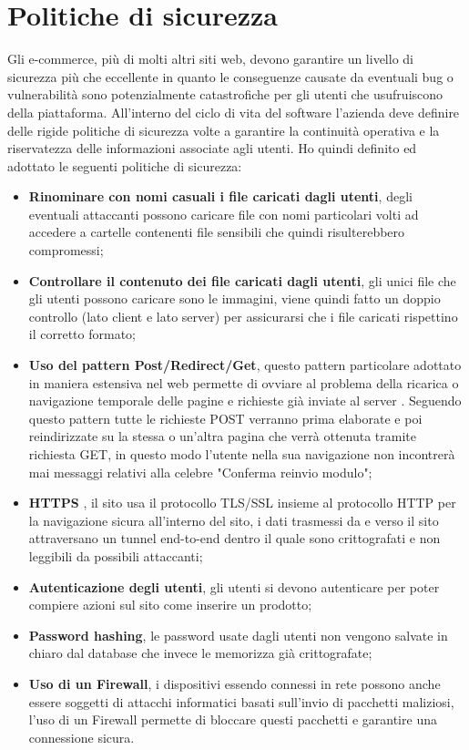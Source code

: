 \section{Politiche di sicurezza}
Gli e-commerce, più di molti altri siti web, devono garantire un livello di sicurezza più che eccellente in quanto le conseguenze causate da eventuali bug o vulnerabilità sono potenzialmente catastrofiche per gli utenti che usufruiscono della piattaforma. All'interno del ciclo di vita del software l'azienda deve definire delle rigide politiche di sicurezza volte a garantire la continuità operativa e la riservatezza delle informazioni associate agli utenti. Ho quindi definito ed adottato le seguenti politiche di sicurezza: 
\begin{itemize}
    \item \textbf{Rinominare con nomi casuali i file caricati dagli utenti}, degli eventuali attaccanti possono caricare file con nomi particolari volti ad accedere a cartelle contenenti file sensibili che quindi risulterebbero compromessi; 
    \item \textbf{Controllare il contenuto dei file caricati dagli utenti}, gli unici file che gli utenti possono caricare sono le immagini, viene quindi fatto un doppio controllo (lato client e lato server) per assicurarsi che i file caricati rispettino il corretto formato; 
    \item \textbf{Uso del pattern Post/Redirect/Get}, questo pattern particolare adottato in maniera estensiva nel web permette di ovviare al problema della ricarica o navigazione temporale delle pagine e richieste già inviate al server \cite{PRG}. Seguendo questo pattern tutte le richieste POST verranno prima elaborate e poi reindirizzate su la stessa o un'altra pagina che verrà ottenuta tramite richiesta GET, in questo modo l'utente nella sua navigazione non incontrerà mai messaggi relativi alla celebre "Conferma reinvio modulo"; 
    \item \textbf{HTTPS} \cite{HTTPS}, il sito usa il protocollo TLS/SSL insieme al protocollo HTTP per la navigazione sicura all'interno del sito, i dati trasmessi da e verso il sito attraversano un tunnel end-to-end dentro il quale sono crittografati e non leggibili da possibili attaccanti; 
    \item \textbf{Autenticazione degli utenti}, gli utenti si devono autenticare per poter compiere azioni sul sito come inserire un prodotto; 
    \item \textbf{Password hashing}, le password usate dagli utenti non vengono salvate in chiaro dal database che invece le memorizza già crittografate;
    \item \textbf{Uso di un Firewall}, i dispositivi essendo connessi in rete possono anche essere soggetti di attacchi informatici basati sull'invio di pacchetti maliziosi, l'uso di un Firewall permette di bloccare questi pacchetti e garantire una connessione sicura.  
\end{itemize} 
